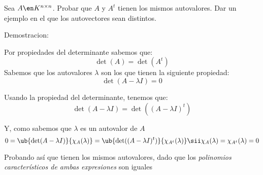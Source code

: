 \begin{enunciado}{\ejercicio}
  Sea $A \en K^{n \times n}$. Probar que $A$ y $A^t$ tienen los mismos autovalores. Dar un ejemplo en el
  que los autovectores sean distintos.
\end{enunciado}

Demostracion:

Por propiedades del determinante sabemos que:
$$
  \det(A) = \det(A^t)
$$
Sabemos que los autovalores $\lambda$ son los que tienen la siguiente propiedad:
$$
  \det(A - \lambda I) = 0
$$

Usando la propiedad del determinante, tenemos que:
$$
  \det(A - \lambda I) = \det((A - \lambda I)^t)
$$

Y, como sabemos que $\lambda$ es un autovalor de $A$
$$
  0 =
  \ub{
    \det(A - \lambda I)
  }{\chi_A(\lambda)} =
  \ub{
    \det((A - \lambda I)^t)
  }{\chi_{A^t}(\lambda)}
  \sii
  \chi_A(\lambda) = \chi_{A^t}(\lambda) = 0
$$

Probando así que tienen los mismos autovalores, dado que los \textit{polinomios característicos de ambas expresiones} son iguales


\begin{aportes}
  \item {}
\end{aportes}
